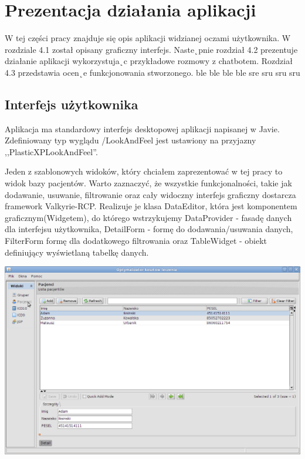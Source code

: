 \chapter{Prezentacja działania aplikacji}
\label{cha:prezentacja}

W tej części pracy znajduje się opis aplikacji widzianej oczami użytkownika. W rozdziale 4.1 został
opisany graficzny interfejs. Naste˛pnie rozdział 4.2 prezentuje działanie aplikacji wykorzystuja˛c przykładowe
rozmowy z chatbotem. Rozdział 4.3 przedstawia ocen˛e funkcjonowania stworzonego. ble ble ble ble sre sru sru sru


\section{Interfejs użytkownika}
\label{sec:interfejsUzytkownika}
Aplikacja ma standardowy interfejs desktopowej aplikacji napisanej w Javie. Zdefiniowany typ wyglądu /LookAndFeel jest ustawiony na przyjazny ,,PlasticXPLookAndFeel''.

Jeden z szablonowych widoków, który chciałem zaprezentować w tej pracy to widok bazy pacjentów. Warto zaznaczyć, że wszystkie funkcjonalności, takie jak dodawanie, usuwanie, filtrowanie oraz cały widoczny interfejs graficzny dostarcza framework Valkyrie-RCP. Realizuje je klasa DataEditor, która jest komponentem graficznym(Widgetem), do którego wstrzykujemy DataProvider - fasadę danych dla interfejsu użytkownika, DetailForm - formę do dodawania/usuwania danych, FilterForm formę dla dodatkowego filtrowania oraz TableWidget - obiekt definiujący wyświetlaną tabelkę danych.

\includegraphics[scale=0.4]{images/patient} 

